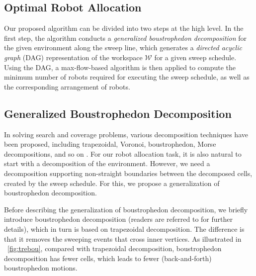 
\subsection{Optimal Robot Allocation}


Our proposed algorithm can be divided into two steps at the high level. 
In the first step, the algorithm conducts a \emph{generalized boustrophedon 
decomposition} for the given environment along the sweep line, 
which generates a \textit{directed acyclic graph} (DAG) representation 
of the workspace $\mathcal W$ for a given sweep schedule. 
Using the DAG, a max-flow-based algorithm is then applied to compute the 
minimum number of robots required for executing the sweep schedule, 
as well as the corresponding arrangement of robots.

\subsection{Generalized Boustrophedon Decomposition}
In solving search and coverage problems, various decomposition techniques 
have been proposed, including trapezoidal, Voronoi, boustrophedon, Morse decompositions, 
and so on \cite{huang2001optimal, choset2000coverage, breitenmoser2010voronoi, acar2002morse}.
For our robot allocation task, it is also natural to start with a decomposition 
of the environment. 
However, we need a decomposition supporting non-straight 
boundaries between the decomposed cells, created by the sweep schedule. 
For this, we propose a generalization of boustrophedon decomposition. 

Before describing the generalization of boustrophedon decomposition, 
we briefly introduce boustrophedon decomposition (readers are referred to 
\cite{choset2000coverage} for further details), which in turn is based on 
trapezoidal decomposition. The difference is that it removes the sweeping 
events that cross inner vertices. As illustrated in ~\ref{fig:trebou},
compared with trapezoidal decomposition, boustrophedon decomposition 
has fewer cells, which leads to fewer (back-and-forth) boustrophedon motions.

